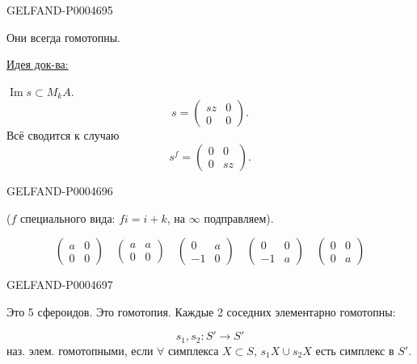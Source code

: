 \begin{GelfandAdjacentEvidence}{GELFAND-P000469}{5}


Они всегда гомотопны.

\uline{Идея док-ва:}

$\operatorname{Im}s\subset M_kA$.
\[
s=\left(\begin{array}{c|c}sz&0\\\hline 0&0\end{array}\right).
\]
Всё сводится к случаю
\[
s^f=\left(\begin{array}{c|c}0&0\\\hline 0&sz\end{array}\right).
\]
\end{GelfandAdjacentEvidence}
\begin{GelfandAdjacentEvidence}{GELFAND-P000469}{6}


($f$ специального вида: $fi=i+k$, на $\infty$ подправляем).

\[
\begin{pmatrix}a&0\\0&0\end{pmatrix}\quad
\begin{pmatrix}a&a\\0&0\end{pmatrix}\quad
\begin{pmatrix}0&a\\-1&0\end{pmatrix}\quad
\begin{pmatrix}0&0\\-1&a\end{pmatrix}\quad
\begin{pmatrix}0&0\\0&a\end{pmatrix}
\]
\end{GelfandAdjacentEvidence}
\begin{GelfandAdjacentEvidence}{GELFAND-P000469}{7}

Это 5 сфероидов. Это гомотопия. Каждые 2 соседних элементарно гомотопны:

\[
s_1,s_2\colon S'\longrightarrow S'
\]
наз. элем. гомотопными, если $\forall$ симплекса $X\subset S$, $s_1X\cup s_2X$
есть симплекс в $S'$.
\end{GelfandAdjacentEvidence}
